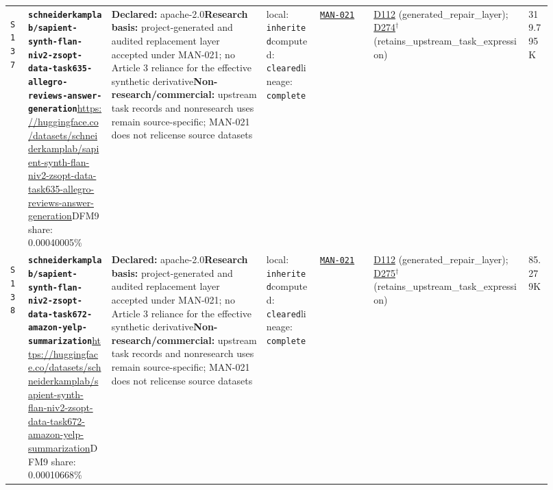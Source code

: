 \documentclass[9pt,a4paper]{article}
\newcommand{\srcid}[1]{\hypertarget{src:#1}{\texttt{#1}}}
\begin{document}
\begin{landscape}
\begin{longtable}{@{}L{0.03\linewidth}L{0.14\linewidth}L{0.26\linewidth}L{0.09\linewidth}L{0.09\linewidth}L{0.265\linewidth}L{0.045\linewidth}@{}}
\srcid{S137} & \textbf{\nolinkurl{schneiderkamplab/sapient-synth-flan-niv2-zsopt-data-task635-allegro-reviews-answer-generation}}\newline \url{https://huggingface.co/datasets/schneiderkamplab/sapient-synth-flan-niv2-zsopt-data-task635-allegro-reviews-answer-generation}\newline DFM9 share: 0.00040005\% & \textbf{Declared:} apache-2.0\newline \textbf{Research basis:} project-generated and audited replacement layer accepted under MAN-021; no Article 3 reliance for the effective synthetic derivative\newline \textbf{Non-research/commercial:} upstream task records and nonresearch uses remain source-specific; MAN-021 does not relicense source datasets & local: \texttt{inherited}\newline computed: \texttt{cleared}\newline lineage: \texttt{complete} & \hyperlink{manual:MAN-021}{\texttt{MAN-021}} & \hyperlink{dep:D112}{D112} (generated\_repair\_layer); \hyperlink{dep:D274}{D274}$^{\dagger}$ (retains\_upstream\_task\_expression) & 319.795K \\
\srcid{S138} & \textbf{\nolinkurl{schneiderkamplab/sapient-synth-flan-niv2-zsopt-data-task672-amazon-yelp-summarization}}\newline \url{https://huggingface.co/datasets/schneiderkamplab/sapient-synth-flan-niv2-zsopt-data-task672-amazon-yelp-summarization}\newline DFM9 share: 0.00010668\% & \textbf{Declared:} apache-2.0\newline \textbf{Research basis:} project-generated and audited replacement layer accepted under MAN-021; no Article 3 reliance for the effective synthetic derivative\newline \textbf{Non-research/commercial:} upstream task records and nonresearch uses remain source-specific; MAN-021 does not relicense source datasets & local: \texttt{inherited}\newline computed: \texttt{cleared}\newline lineage: \texttt{complete} & \hyperlink{manual:MAN-021}{\texttt{MAN-021}} & \hyperlink{dep:D112}{D112} (generated\_repair\_layer); \hyperlink{dep:D275}{D275}$^{\dagger}$ (retains\_upstream\_task\_expression) & 85.279K \\

\end{longtable}
\end{landscape}
\end{document}
